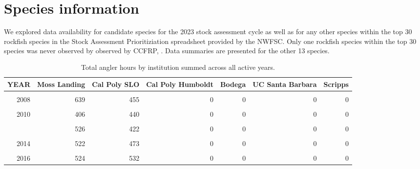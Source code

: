 \documentclass[
]{article}
\begin{document}
\hypertarget{species-information}{%
\section{Species information}\label{species-information}}

We explored data availability for candidate species for the 2023 stock assessment
cycle as well as for any other species within the top 30 rockfish species in the
Stock Assessment Prioritiziation spreadsheet provided by the NWFSC. Only one rockfish
species within the top 30 species was never observed by observed by CCFRP, .
Data summaries are presented for the other 13 species.

\newpage

\begin{table}

\caption{\label{tab:anghrs}Total angler hours by institution summed across all active years.}
\centering
\begin{tabular}[t]{rrrrrrr}
\toprule
YEAR & Moss Landing & Cal Poly SLO & Cal Poly Humboldt & Bodega & UC Santa Barbara & Scripps\\
\midrule
\cellcolor{gray!6}{2007} & \cellcolor{gray!6}{450} & \cellcolor{gray!6}{277} & \cellcolor{gray!6}{0} & \cellcolor{gray!6}{0} & \cellcolor{gray!6}{0} & \cellcolor{gray!6}{0}\\
2008 & 639 & 455 & 0 & 0 & 0 & 0\\
\cellcolor{gray!6}{2009} & \cellcolor{gray!6}{343} & \cellcolor{gray!6}{339} & \cellcolor{gray!6}{0} & \cellcolor{gray!6}{0} & \cellcolor{gray!6}{0} & \cellcolor{gray!6}{0}\\
2010 & 406 & 440 & 0 & 0 & 0 & 0\\
\cellcolor{gray!6}{2011} & \cellcolor{gray!6}{459} & \cellcolor{gray!6}{393} & \cellcolor{gray!6}{0} & \cellcolor{gray!6}{0} & \cellcolor{gray!6}{0} & \cellcolor{gray!6}{0}\\
\addlinespace
2012 & 526 & 422 & 0 & 0 & 0 & 0\\
\cellcolor{gray!6}{2013} & \cellcolor{gray!6}{484} & \cellcolor{gray!6}{376} & \cellcolor{gray!6}{0} & \cellcolor{gray!6}{0} & \cellcolor{gray!6}{0} & \cellcolor{gray!6}{0}\\
2014 & 522 & 473 & 0 & 0 & 0 & 0\\
\cellcolor{gray!6}{2015} & \cellcolor{gray!6}{264} & \cellcolor{gray!6}{272} & \cellcolor{gray!6}{0} & \cellcolor{gray!6}{0} & \cellcolor{gray!6}{0} & \cellcolor{gray!6}{0}\\
2016 & 524 & 532 & 0 & 0 & 0 & 0\\

\end{tabular}
\end{table}
\end{document}
